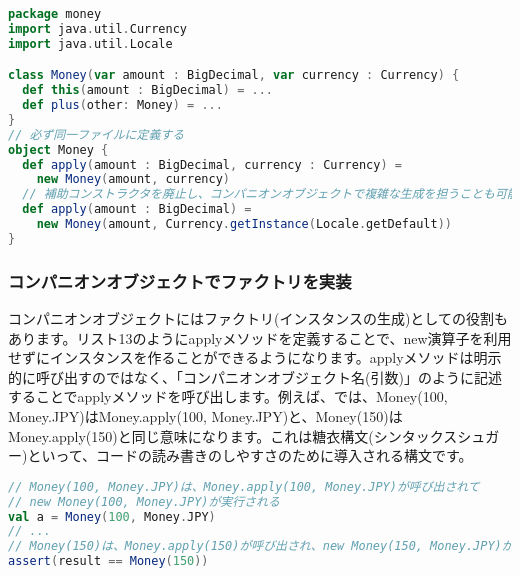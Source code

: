 \begin{lstlisting}[language=scala, label=src:factory_method, caption=コンパニオンオブジェクト内部にファクトリメソッド(applyメソッド)を定義する]
package money
import java.util.Currency
import java.util.Locale

class Money(var amount : BigDecimal, var currency : Currency) {
  def this(amount : BigDecimal) = ...
  def plus(other: Money) = ...
}
// 必ず同一ファイルに定義する
object Money {
  def apply(amount : BigDecimal, currency : Currency) =
    new Money(amount, currency)
  // 補助コンストラクタを廃止し、コンパニオンオブジェクトで複雑な生成を担うことも可能
  def apply(amount : BigDecimal) =
    new Money(amount, Currency.getInstance(Locale.getDefault))
}
\end{lstlisting}

\subsubsection{コンパニオンオブジェクトでファクトリを実装}
コンパニオンオブジェクトにはファクトリ(インスタンスの生成)としての役割もあります。リスト13のようにapplyメソッドを定義することで、new演算子を利用せずにインスタンスを作ることができるようになります。applyメソッドは明示的に呼び出すのではなく、「コンパニオンオブジェクト名(引数)」のように記述することでapplyメソッドを呼び出します。例えば、では、Money(100, Money.JPY)はMoney.apply(100, Money.JPY)と、Money(150)はMoney.apply(150)と同じ意味になります。これは糖衣構文(シンタックスシュガー)といって、コードの読み書きのしやすさのために導入される構文です。

\begin{lstlisting}[language=scala, label=src:apply_method, caption=applyメソッドの呼び出し例。糖衣構文により簡単に呼び出せる]
// Money(100, Money.JPY)は、Money.apply(100, Money.JPY)が呼び出されて
// new Money(100, Money.JPY)が実行される
val a = Money(100, Money.JPY)
// ...
// Money(150)は、Money.apply(150)が呼び出され、new Money(150, Money.JPY)が実行される
assert(result == Money(150))
\end{lstlisting}


